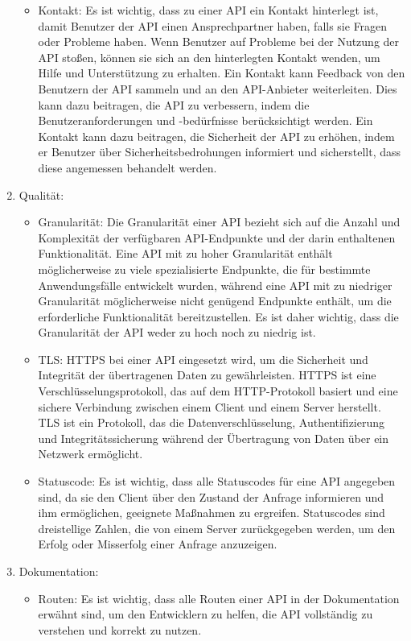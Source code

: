 \documentclass[notitlepage, hidelinks]{article}
\begin{document}
\begin{enumerate}
\begin{itemize}
\item Kontakt: Es ist wichtig, dass zu einer API ein Kontakt hinterlegt ist, damit Benutzer der API einen Ansprechpartner haben, falls sie Fragen oder Probleme haben. Wenn Benutzer auf Probleme bei der Nutzung der API stoßen, können sie sich an den hinterlegten Kontakt wenden, um Hilfe und Unterstützung zu erhalten. Ein Kontakt kann Feedback von den Benutzern der API sammeln und an den API-Anbieter weiterleiten. Dies kann dazu beitragen, die API zu verbessern, indem die Benutzeranforderungen und -bedürfnisse berücksichtigt werden. Ein Kontakt kann dazu beitragen, die Sicherheit der API zu erhöhen, indem er Benutzer über Sicherheitsbedrohungen informiert und sicherstellt, dass diese angemessen behandelt werden.
\end{itemize}
\item Qualität: 
\begin{itemize}
\item Granularität: Die Granularität einer API bezieht sich auf die Anzahl und Komplexität der verfügbaren API-Endpunkte und der darin enthaltenen Funktionalität. Eine API mit zu hoher Granularität enthält möglicherweise zu viele spezialisierte Endpunkte, die für bestimmte Anwendungsfälle entwickelt wurden, während eine API mit zu niedriger Granularität möglicherweise nicht genügend Endpunkte enthält, um die erforderliche Funktionalität bereitzustellen. Es ist daher wichtig, dass die Granularität der API weder zu hoch noch zu niedrig ist.
\item TLS: HTTPS bei einer API eingesetzt wird, um die Sicherheit und Integrität der übertragenen Daten zu gewährleisten. HTTPS ist eine Verschlüsselungsprotokoll, das auf dem HTTP-Protokoll basiert und eine sichere Verbindung zwischen einem Client und einem Server herstellt. TLS ist ein Protokoll, das die Datenverschlüsselung, Authentifizierung und Integritätssicherung während der Übertragung von Daten über ein Netzwerk ermöglicht.
\item Statuscode: Es ist wichtig, dass alle Statuscodes für eine API angegeben sind, da sie den Client über den Zustand der Anfrage informieren und ihm ermöglichen, geeignete Maßnahmen zu ergreifen. Statuscodes sind dreistellige Zahlen, die von einem Server zurückgegeben werden, um den Erfolg oder Misserfolg einer Anfrage anzuzeigen. 
\end{itemize}
\item Dokumentation:
\begin{itemize}
\item Routen: Es ist wichtig, dass alle Routen einer API in der Dokumentation erwähnt sind, um den Entwicklern zu helfen, die API vollständig zu verstehen und korrekt zu nutzen. 

\end{itemize}
\end{enumerate}
\end{document}
